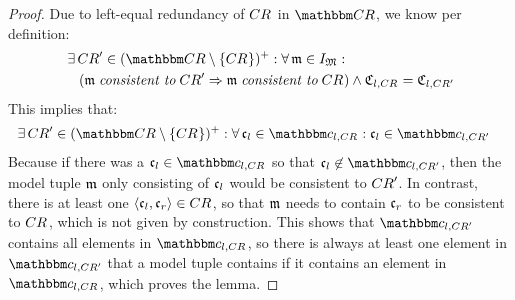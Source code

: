 \begin{proof}
    Due to left-equal redundancy of $\consistencyrelation{CR}{}$ in $\consistencyrelationset{CR}$, we know per definition:
    \begin{align*}
        &
        \exists \consistencyrelation{CR}{}' \in \transitiveclosure{(\consistencyrelationset{CR} \setminus \setted{\consistencyrelation{CR}{}})} :
        \forall \modeltuple{m} \in \metamodeltupleinstanceset{M} : \\
        & \formulaskip
        (\modeltuple{m} \consistenttomath \consistencyrelation{CR}{}' \Rightarrow \modeltuple{m} \consistenttomath \consistencyrelation{CR}{})
        \land 
        \classtuple{C}{l,\consistencyrelation{CR}{}} = \classtuple{C}{l,\consistencyrelation{CR}{}'}
    \end{align*}
    This implies that:
    \begin{align*}
        &
        \exists \consistencyrelation{CR}{}' \in \transitiveclosure{(\consistencyrelationset{CR} \setminus \setted{\consistencyrelation{CR}{}})} :
        \forall \conditionelement{c}{l} \in \condition{c}{l,\consistencyrelation{CR}{}} :
        \conditionelement{c}{l} \in \condition{c}{l,\consistencyrelation{CR}{}'}
    \end{align*}
    Because if there was a $\conditionelement{c}{l} \in \condition{c}{l,\consistencyrelation{CR}{}}$ so that $\conditionelement{c}{l} \not\in \condition{c}{l,\consistencyrelation{CR}{}'}$, then the model tuple $\modeltuple{m}$ only consisting of $\conditionelement{c}{l}$ would be consistent to $\consistencyrelation{CR}{}'$.
    In contrast, there is at least one $\tupled{\conditionelement{c}{l}, \conditionelement{c}{r}} \in \consistencyrelation{CR}{}$, so that $\modeltuple{m}$ needs to contain $\conditionelement{c}{r}$ to be consistent to $\consistencyrelation{CR}{}$, which is not given by construction.
    This shows that $\condition{c}{l,\consistencyrelation{CR}{}'}$ contains all elements in $\condition{c}{l,\consistencyrelation{CR}{}}$, so there is always at least one element in $\condition{c}{l,\consistencyrelation{CR}{}'}$ that a model tuple contains if it contains an element in $\condition{c}{l,\consistencyrelation{CR}{}}$, which proves the lemma.
\end{proof}

